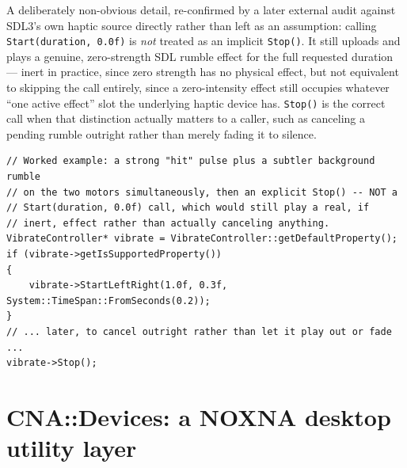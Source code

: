 A deliberately non-obvious detail, re-confirmed by a later external audit against SDL3's own
haptic source directly rather than left as an assumption: calling \texttt{Start(duration, 0.0f)}
is \emph{not} treated as an implicit \texttt{Stop()}. It still uploads and plays a genuine,
zero-strength SDL rumble effect for the full requested duration --- inert in practice, since
zero strength has no physical effect, but not equivalent to skipping the call entirely, since a
zero-intensity effect still occupies whatever ``one active effect'' slot the underlying haptic
device has. \texttt{Stop()} is the correct call when that distinction actually matters to a
caller, such as canceling a pending rumble outright rather than merely fading it to silence.

\begin{lstlisting}
// Worked example: a strong "hit" pulse plus a subtler background rumble
// on the two motors simultaneously, then an explicit Stop() -- NOT a
// Start(duration, 0.0f) call, which would still play a real, if
// inert, effect rather than actually canceling anything.
VibrateController* vibrate = VibrateController::getDefaultProperty();
if (vibrate->getIsSupportedProperty())
{
    vibrate->StartLeftRight(1.0f, 0.3f, System::TimeSpan::FromSeconds(0.2));
}
// ... later, to cancel outright rather than let it play out or fade ...
vibrate->Stop();
\end{lstlisting}

\section{CNA::Devices: a NOXNA desktop utility layer}


